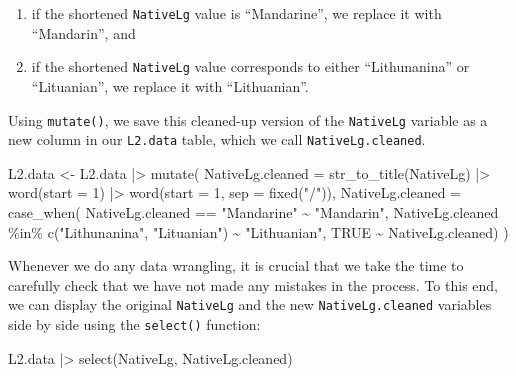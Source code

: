 \documentclass[
  letterpaper,
  DIV=11,
  numbers=noendperiod]{scrreprt}
\newenvironment{Shaded}{\begin{snugshade}}{\end{snugshade}}
\newcommand{\AttributeTok}[1]{\textcolor[rgb]{0.40,0.45,0.13}{#1}}
\newcommand{\ConstantTok}[1]{\textcolor[rgb]{0.56,0.35,0.01}{#1}}
\newcommand{\DecValTok}[1]{\textcolor[rgb]{0.68,0.00,0.00}{#1}}
\newcommand{\FunctionTok}[1]{\textcolor[rgb]{0.28,0.35,0.67}{#1}}
\newcommand{\NormalTok}[1]{\textcolor[rgb]{0.00,0.23,0.31}{#1}}
\newcommand{\OtherTok}[1]{\textcolor[rgb]{0.00,0.23,0.31}{#1}}
\newcommand{\SpecialCharTok}[1]{\textcolor[rgb]{0.37,0.37,0.37}{#1}}
\newcommand{\StringTok}[1]{\textcolor[rgb]{0.13,0.47,0.30}{#1}}
\providecommand{\tightlist}{%
  \setlength{\itemsep}{0pt}\setlength{\parskip}{0pt}}
\begin{document}
\begin{enumerate}
\def\labelenumi{\alph{enumi}.}
\tightlist
\item
  if the shortened \texttt{NativeLg} value is ``Mandarine'', we replace
  it with ``Mandarin'', and
\item
  if the shortened \texttt{NativeLg} value corresponds to either
  ``Lithunanina'' or ``Lituanian'', we replace it with ``Lithuanian''.
\end{enumerate}

Using \texttt{mutate()}, we save this cleaned-up version of the
\texttt{NativeLg} variable as a new column in our \texttt{L2.data}
table, which we call \texttt{NativeLg.cleaned}.

\begin{Shaded}
\begin{Highlighting}[]
\NormalTok{L2.data }\OtherTok{\textless{}{-}}\NormalTok{ L2.data }\SpecialCharTok{|\textgreater{}}
  \FunctionTok{mutate}\NormalTok{(}
    \AttributeTok{NativeLg.cleaned =} \FunctionTok{str\_to\_title}\NormalTok{(NativeLg) }\SpecialCharTok{|\textgreater{}} 
      \FunctionTok{word}\NormalTok{(}\AttributeTok{start =} \DecValTok{1}\NormalTok{) }\SpecialCharTok{|\textgreater{}} 
      \FunctionTok{word}\NormalTok{(}\AttributeTok{start =} \DecValTok{1}\NormalTok{, }\AttributeTok{sep =} \FunctionTok{fixed}\NormalTok{(}\StringTok{"/"}\NormalTok{)),}
    \AttributeTok{NativeLg.cleaned =} \FunctionTok{case\_when}\NormalTok{(}
\NormalTok{      NativeLg.cleaned }\SpecialCharTok{==} \StringTok{"Mandarine"} \SpecialCharTok{\textasciitilde{}} \StringTok{"Mandarin"}\NormalTok{,}
\NormalTok{      NativeLg.cleaned }\SpecialCharTok{\%in\%} \FunctionTok{c}\NormalTok{(}\StringTok{"Lithunanina"}\NormalTok{, }\StringTok{"Lituanian"}\NormalTok{) }\SpecialCharTok{\textasciitilde{}} \StringTok{"Lithuanian"}\NormalTok{,}
      \ConstantTok{TRUE} \SpecialCharTok{\textasciitilde{}}\NormalTok{ NativeLg.cleaned)}
\NormalTok{    )}
\end{Highlighting}
\end{Shaded}

Whenever we do any data wrangling, it is crucial that we take the time
to carefully check that we have not made any mistakes in the process. To
this end, we can display the original \texttt{NativeLg} and the new
\texttt{NativeLg.cleaned} variables side by side using the
\texttt{select()} function:

\begin{Shaded}
\begin{Highlighting}[]
\NormalTok{L2.data }\SpecialCharTok{|\textgreater{}} 
  \FunctionTok{select}\NormalTok{(NativeLg, NativeLg.cleaned)}
\end{Highlighting}
\end{Shaded}
\end{document}
